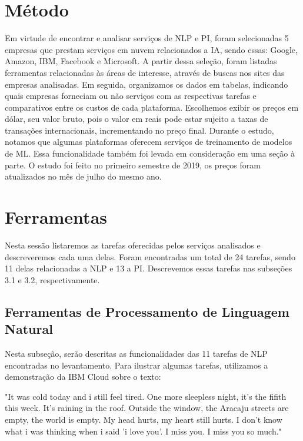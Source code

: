 \documentclass{article}
\begin{document}
\section{Método}
Em virtude de encontrar e analisar serviços de NLP e PI, foram selecionadas 5 empresas que prestam serviços em nuvem relacionados a IA, sendo essas: Google, Amazon, IBM, Facebook e Microsoft. A partir dessa seleção, foram listadas ferramentas relacionadas às áreas de interesse, através de buscas nos sites das empresas analisadas. Em seguida, organizamos os dados em tabelas, indicando quais empresas forneciam ou não serviços com as respectivas tarefas e comparativos entre os custos de cada plataforma. Escolhemos exibir os preços em dólar, seu valor bruto, pois o valor em reais pode estar sujeito a taxas de transações internacionais, incrementando no preço final. Durante o estudo, notamos que algumas plataformas oferecem serviços de treinamento de modelos de ML. Essa funcionalidade também foi levada em consideração em uma seção à parte. O estudo foi feito no primeiro semestre de 2019, os preços foram atualizados no mês de julho do mesmo ano.

\section{Ferramentas}
Nesta sessão listaremos as tarefas oferecidas pelos serviços analisados e descreveremos cada uma delas. Foram encontradas um total de 24 tarefas, sendo 11 delas relacionadas a NLP e 13 a PI. Descrevemos essas tarefas nas subseções 3.1 e 3.2, respectivamente.

\subsection{Ferramentas de Processamento de Linguagem Natural}

Nesta subseção, serão descritas as funcionalidades das 11 tarefas de NLP encontradas no levantamento. Para ilustrar algumas tarefas, utilizamos a demonstração da IBM Cloud sobre o texto: 
\begin{myquote}
        "It was cold today and i still feel tired. One more sleepless night, it's the fifith this week. It's raining in the roof. Outside the window, the Aracaju streets are empty, the world is empty. My head hurts, my heart still hurts. I don't know what i was thinking when i said 'i love you'. I miss you. I miss you so much."
\end{myquote}
\end{document}
